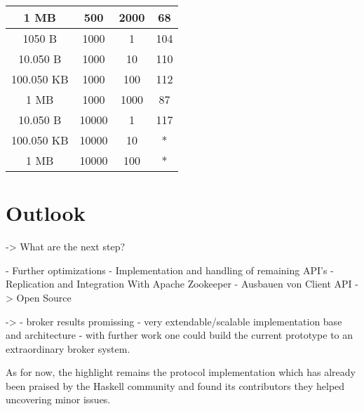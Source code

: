 \begin{table}[h]
\begin{tabular}{|c|c|c|c|}
1 MB                                & 500                           & 2000             & 68                                                                         \\ \hline
1050 B                              & 1000                          & 1                & 104                                                                        \\ \hline
10.050 B                            & 1000                          & 10               & 110                                                                        \\ \hline
100.050 KB                          & 1000                          & 100              & 112                                                                        \\ \hline
1 MB                                & 1000                          & 1000             & 87                                                                         \\ \hline
10.050 B                            & 10000                         & 1                & 117                                                                        \\ \hline
100.050 KB                          & 10000                         & 10               & *                                                                          \\ \hline
1 MB                                & 10000                         & 100              & *                                                                          \\ \hline
\end{tabular}
\end{table}


\section{Outlook}
-> What are the next step? 

- Further optimizations 
- Implementation and handling of remaining API's 
- Replication and Integration With Apache Zookeeper 
- Ausbauen von Client API 
-> Open Source 

-> 
- broker results promissing
- very extendable/scalable implementation base and architecture
- with further work one could build the current prototype to an extraordinary
broker system.

As for now, the highlight remains the protocol implementation which has already
been praised by the Haskell community and found its contributors they helped
uncovering minor issues.

